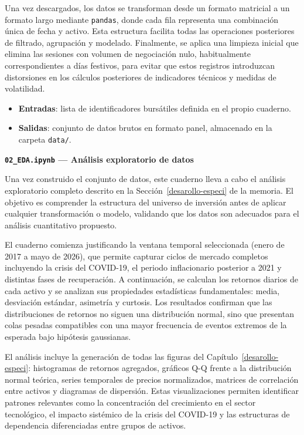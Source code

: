 Una vez descargados, los datos se transforman desde un formato matricial a un formato largo mediante \texttt{pandas}, donde cada fila representa una combinación única de fecha y activo. Esta estructura facilita todas las operaciones posteriores de filtrado, agrupación y modelado. Finalmente, se aplica una limpieza inicial que elimina las sesiones con volumen de negociación nulo, habitualmente correspondientes a días festivos, para evitar que estos registros introduzcan distorsiones en los cálculos posteriores de indicadores técnicos y medidas de volatilidad.

\begin{itemize}
    \item \textbf{Entradas}: lista de identificadores bursátiles definida en el propio cuaderno.
    \item \textbf{Salidas}: conjunto de datos brutos en formato panel, almacenado en la carpeta \texttt{data/}.
\end{itemize}

\textbf{\texttt{02\_EDA.ipynb} --- Análisis exploratorio de datos}

Una vez construido el conjunto de datos, este cuaderno lleva a cabo el análisis exploratorio completo descrito en la Sección~\ref{desarollo-especi} de la memoria. El objetivo es comprender la estructura del universo de inversión antes de aplicar cualquier transformación o modelo, validando que los datos son adecuados para el análisis cuantitativo propuesto.

El cuaderno comienza justificando la ventana temporal seleccionada (enero de 2017 a mayo de 2026), que permite capturar ciclos de mercado completos incluyendo la crisis del COVID-19, el periodo inflacionario posterior a 2021 y distintas fases de recuperación. A continuación, se calculan los retornos diarios de cada activo y se analizan sus propiedades estadísticas fundamentales: media, desviación estándar, asimetría y curtosis. Los resultados confirman que las distribuciones de retornos no siguen una distribución normal, sino que presentan colas pesadas compatibles con una mayor frecuencia de eventos extremos de la esperada bajo hipótesis gaussianas.

El análisis incluye la generación de todas las figuras del Capítulo~\ref{desarollo-especi}: histogramas de retornos agregados, gráficos Q-Q frente a la distribución normal teórica, series temporales de precios normalizados, matrices de correlación entre activos y diagramas de dispersión. Estas visualizaciones permiten identificar patrones relevantes como la concentración del crecimiento en el sector tecnológico, el impacto sistémico de la crisis del COVID-19 y las estructuras de dependencia diferenciadas entre grupos de activos.

